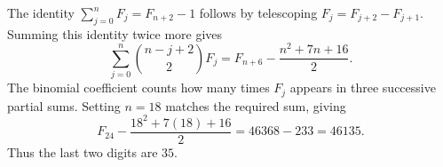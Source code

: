 The identity $\sum_{j=0}^{n}F_j=F_{n+2}-1$ follows by telescoping $F_j=F_{j+2}-F_{j+1}$. Summing this identity twice more gives
\[
\sum_{j=0}^{n}\binom{n-j+2}{2}F_j
=F_{n+6}-\dfrac{n^2+7n+16}{2}.
\]
The binomial coefficient counts how many times $F_j$ appears in three successive partial sums. Setting $n=18$ matches the required sum, giving
\[
F_{24}-\dfrac{18^2+7(18)+16}{2}=46368-233=46135.
\]
Thus the last two digits are $\boxed{35}$.
